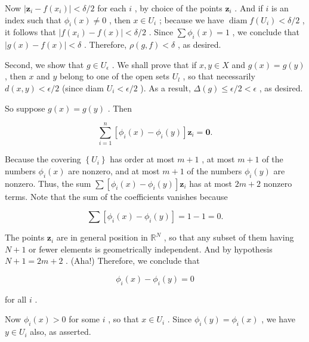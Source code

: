 \documentclass[10pt]{article}
\begin{document}
Now \(\left| {{\mathbf{z}}_{i} - f\left( {x}_{i}\right) }\right|  < \delta /2\) for each \(i\) , by choice of the points \({\mathbf{z}}_{i}\) . And if \(i\) is an index such that \({\phi }_{i}\left( x\right)  \neq  0\) , then \(x \in  {U}_{i}\) ; because we have \(\operatorname{diam}f\left( {U}_{i}\right)  < \delta /2\) , it follows that \(\left| {f\left( {x}_{i}\right)  - f\left( x\right) }\right|  < \delta /2\) . Since \(\sum {\phi }_{i}\left( x\right)  = 1\) , we conclude that \(\left| {g\left( x\right)  - f\left( x\right) }\right|  < \delta\) . Therefore, \(\rho \left( {g,f}\right)  < \delta\) , as desired.

Second, we show that \(g \in  {U}_{\epsilon }\) . We shall prove that if \(x,y \in  X\) and \(g\left( x\right)  = g\left( y\right)\) , then \(x\) and \(y\) belong to one of the open sets \({U}_{l}\) , so that necessarily \(d\left( {x,y}\right)  < \epsilon /2\) (since diam \({U}_{i} < \epsilon /2\) ). As a result, \(\Delta \left( g\right)  \leq  \epsilon /2 < \epsilon\) , as desired.

So suppose \(g\left( x\right)  = g\left( y\right)\) . Then

\[
\mathop{\sum }\limits_{{i = 1}}^{n}\left\lbrack  {{\phi }_{i}\left( x\right)  - {\phi }_{i}\left( y\right) }\right\rbrack  {\mathbf{z}}_{i} = \mathbf{0}.
\]

Because the covering \(\left\{  {U}_{i}\right\}\) has order at most \(m + 1\) , at most \(m + 1\) of the numbers \({\phi }_{i}\left( x\right)\) are nonzero, and at most \(m + 1\) of the numbers \({\phi }_{i}\left( y\right)\) are nonzero. Thus, the sum \(\sum \left\lbrack  {{\phi }_{i}\left( x\right)  - {\phi }_{i}\left( y\right) }\right\rbrack  {\mathbf{z}}_{i}\) has at most \({2m} + 2\) nonzero terms. Note that the sum of the coefficients vanishes because

\[
\sum \left\lbrack  {{\phi }_{i}\left( x\right)  - {\phi }_{i}\left( y\right) }\right\rbrack   = 1 - 1 = 0.
\]

The points \({\mathbf{z}}_{i}\) are in general position in \({\mathbb{R}}^{N}\) , so that any subset of them having \(N + 1\) or fewer elements is geometrically independent. And by hypothesis \(N + 1 = {2m} + 2\) . (Aha!) Therefore, we conclude that

\[
{\phi }_{i}\left( x\right)  - {\phi }_{i}\left( y\right)  = 0
\]

for all \(i\) .

Now \({\phi }_{i}\left( x\right)  > 0\) for some \(i\) , so that \(x \in  {U}_{i}\) . Since \({\phi }_{i}\left( y\right)  = {\phi }_{i}\left( x\right)\) , we have \(y \in  {U}_{i}\) also, as asserted.
\end{document}
